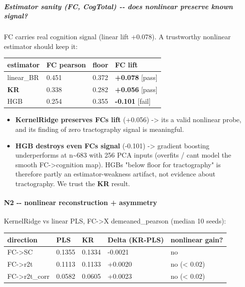 \subparagraph{Estimator sanity (FC, CogTotal) -\/- does nonlinear preserve known signal?}\label{estimator-sanity-fc-cogtotal----does-nonlinear-preserve-known-signal}

FC carries real cognition signal (linear lift +0.078). A trustworthy nonlinear estimator should keep it:

{\def\LTcaptype{none} %
\begin{longtable}[]{@{}llll@{}}
\toprule\noalign{}
estimator & FC pearson & floor & FC lift \\
\midrule\noalign{}
\endhead
\bottomrule\noalign{}
\endlastfoot
linear\_BR & 0.451 & 0.372 & \textbf{+0.078} {[}pass{]} \\
\textbf{KR} & 0.338 & 0.282 & \textbf{+0.056} {[}pass{]} \\
HGB & 0.254 & 0.355 & \textbf{-0.101} {[}fail{]} \\
\end{longtable}
}

\begin{itemize}
\tightlist
\item
  \textbf{KernelRidge preserves FC\textquotesingle s lift} (+0.056) -\textgreater{} it\textquotesingle s a valid nonlinear probe, and its finding of zero tractography signal is meaningful.
\item
  \textbf{HGB destroys even FC\textquotesingle s signal} (-0.101) -\textgreater{} gradient boosting underperforms at n\textasciitilde683 with 256 PCA inputs (overfits / can\textquotesingle t model the smooth FC-\textgreater cognition map). HGB\textquotesingle s "below floor for tractography" is therefore partly an estimator-weakness artifact, not evidence about tractography. We trust the \textbf{KR} result.
\end{itemize}

\paragraph{N2 -\/- nonlinear reconstruction + asymmetry}\label{n2----nonlinear-reconstruction--asymmetry}

KernelRidge vs linear PLS, FC-\textgreater X demeaned\_pearson (median 10 seeds):

{\def\LTcaptype{none} %
\begin{longtable}[]{@{}lllll@{}}
\toprule\noalign{}
direction & PLS & KR & Delta (KR-PLS) & nonlinear gain? \\
\midrule\noalign{}
\endhead
\bottomrule\noalign{}
\endlastfoot
FC-\textgreater SC & 0.1355 & 0.1334 & -0.0021 & no \\
FC-\textgreater r2t & 0.1113 & 0.1133 & +0.0020 & no (\textless{} 0.02) \\
FC-\textgreater r2t\_corr & 0.0582 & 0.0605 & +0.0023 & no (\textless{} 0.02) \\
\end{longtable}
}


